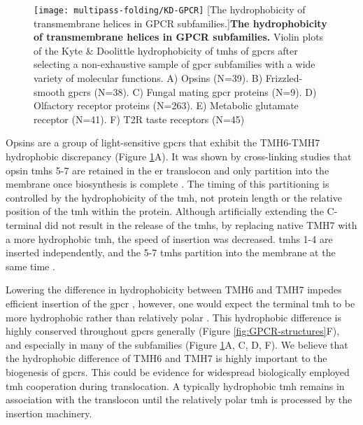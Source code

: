 \begin{figure}[!ht]
\centering
\texttt{[image: multipass-folding/KD-GPCR]}
		[The hydrophobicity of transmembrane helices in GPCR subfamilies.]{\textbf{The hydrophobicity of transmembrane helices in GPCR subfamilies.}
    Violin plots of the Kyte \& Doolittle hydrophobicity \cite{Kyte1982} of \gls{tmh}s of \gls{gpcr}s after selecting a non-exhaustive sample of \gls{gpcr} subfamilies with a wide variety of molecular functions.
    A) Opsins (N=39).
    B) Frizzled-smooth \gls{gpcr}s (N=38).
    C) Fungal mating \gls{gpcr} proteins (N=9).
    D) Olfactory receptor proteins (N=263).
    E) Metabolic glutamate receptor (N=41).
    F) T2R taste receptors (N=45)
    }

\label{fig:KD-GPCR}
\end{figure}

Opsins are a group of light\--sensitive \gls{gpcr}s that exhibit the TMH6\--TMH7 hydrophobic discrepancy (Figure \ref{fig:KD-GPCR}A).
It was shown by cross\--linking studies that opsin \gls{tmh}s 5-7 are retained in the \gls{er} translocon and only partition into the membrane once biosynthesis is complete \cite{Ismail2008}.
The timing of this partitioning is controlled by the hydrophobicity of the \gls{tmh}, not protein length or the relative position of the \gls{tmh} within the protein.
Although artificially extending the C-terminal did not result in the release of the \gls{tmh}s, by replacing native TMH7 with a more hydrophobic \gls{tmh}, the speed of insertion was decreased.
\gls{tmh}s 1-4 are inserted independently, and the 5-7 \gls{tmh}s partition into the membrane at the same time \cite{Ismail2008}.

Lowering the difference in hydrophobicity between TMH6 and TMH7 impedes efficient insertion of the \gls{gpcr} \cite{Ismail2008}, however, one would expect the terminal \gls{tmh} to be more hydrophobic rather than relatively polar \cite{Virkki2014}.
This hydrophobic difference is highly conserved throughout \gls{gpcr}s generally (Figure \ref{fig:GPCR-structures}F), and especially in many of the subfamilies (Figure \ref{fig:KD-GPCR}A, C, D, F).
We believe that the hydrophobic difference of TMH6 and TMH7 is highly important to the biogenesis of \gls{gpcr}s.
This could be evidence for widespread biologically employed \gls{tmh} cooperation during translocation.
A typically hydrophobic \gls{tmh} remains in association with the translocon until the relatively polar \gls{tmh} is processed by the insertion machinery.


